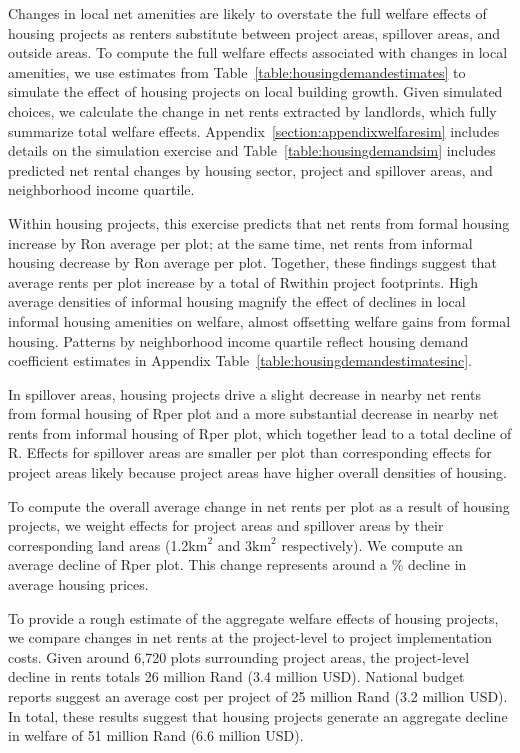 \documentclass[12pt]{article}
\begin{document}
Changes in local net amenities are likely to overstate the full welfare effects of housing projects as renters substitute between project areas, spillover areas, and outside areas.  To compute the full welfare effects associated with changes in local amenities, we use estimates from Table~\ref{table:housingdemandestimates} to simulate the effect of housing projects on local building growth.  Given simulated choices, we calculate the change in net rents extracted by landlords, which fully summarize total welfare effects.  Appendix~\ref{section:appendixwelfaresim} includes details on the simulation exercise and Table~\ref{table:housingdemandsim} includes predicted net rental changes by housing sector, project and spillover areas, and neighborhood income quartile.

Within housing projects, this exercise predicts that net rents from formal housing increase by Ron average per plot; at the same time, net rents from informal housing decrease by Ron average per plot.  Together, these findings suggest that average rents per plot increase by a total of Rwithin project footprints. High average densities of informal housing magnify the effect of declines in local informal housing amenities on welfare, almost offsetting welfare gains from formal housing.  Patterns by neighborhood income quartile reflect housing demand coefficient estimates in Appendix Table~\ref{table:housingdemandestimatesinc}.

In spillover areas, housing projects drive a slight decrease in nearby net rents from formal housing of Rper plot and a more substantial decrease in nearby net rents from informal housing of Rper plot, which together lead to a total decline of R\unskip.  Effects for spillover areas are smaller per plot than corresponding effects for project areas likely because project areas have higher overall densities of housing.

To compute the overall average change in net rents per plot as a result of housing projects, we weight effects for project areas and spillover areas by their corresponding land areas (1.2$\text{km}^{2}$ and 3$\text{km}^{2}$ respectively).  We compute an average decline of Rper plot.  This change represents around a \unskip\% decline in average housing prices.  

To provide a rough estimate of the aggregate welfare effects of housing projects, we compare changes in net rents at the project-level to project implementation costs.  Given around 6,720 plots surrounding project areas, the project-level decline in rents totals 26 million Rand (3.4 million USD).  National budget reports suggest an average cost per project of 25 million Rand (3.2 million USD).  In total, these results suggest that housing projects generate an aggregate decline in welfare of 51 million Rand (6.6 million USD).
\end{document}
